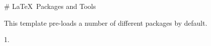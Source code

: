 


\newpage
\begin{markdown}

# \LaTeX\ Packages and Tools

This template pre-loads a number of different packages by default. 

1. 

\end{markdown}